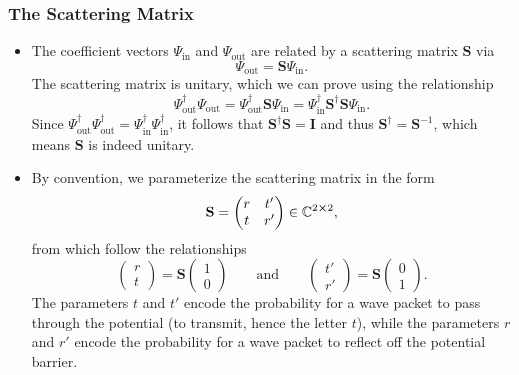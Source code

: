 \documentclass[11pt, a4paper]{article}
\newcommand{\mat}[1]{\mathbf{#1}}  %
\renewcommand{\SS}{\mat{S}}  %
\begin{document}
\subsubsection{The Scattering Matrix}
\begin{itemize}
    \item The coefficient vectors $ \Psi_{\text{in}} $ and $ \Psi_{\text{out}} $ are related by a scattering matrix $ \SS $ via
    \begin{equation*}
        \Psi_{\text{out}} = \SS \Psi_{\text{in}}.
    \end{equation*}
    The scattering matrix is unitary, which we can prove using the relationship
    \begin{equation*}
        \Psi_{\text{out}}^{\dagger} \Psi_{\text{out}} = \Psi_{\text{out}}^{\dagger} \SS \Psi_{\text{in}} = \Psi_{\text{in}}^{\dagger} \SS^{\dagger} \SS \Psi_{\text{in}}.
    \end{equation*}
    Since $ \Psi_{\text{out}}^{\dagger} \Psi_{\text{out}}^{\dagger} = \Psi_{\text{in}}^{\dagger} \Psi_{\text{in}}^{\dagger} $, it follows that $ \SS^{\dagger} \SS = \mathbf{I} $ and thus $ \SS^{\dagger} = \SS^{-1} $, which means $ \SS $ is indeed unitary.

    \item By convention, we parameterize the scattering matrix in the form
    \begin{equation*}
        \SS = 
        \begin{pmatrix}
            r & t'\\
            t & r'
        \end{pmatrix} \in \mathbb{C}^{2 \cross 2},
    \end{equation*}
    from which follow the relationships
    \begin{equation*}
        \begin{pmatrix}
            r\\
            t
        \end{pmatrix} 
        = \SS
        \begin{pmatrix}
            1\\
            0
        \end{pmatrix}
        \qquad \text{and} \qquad 
        \begin{pmatrix}
            t'\\
            r'
        \end{pmatrix}
        = \SS
        \begin{pmatrix}
            0\\
            1
        \end{pmatrix}.
    \end{equation*}
    The parameters $ t $ and $ t' $ encode the probability for a wave packet to pass through the potential (to transmit, hence the letter $ t $), while the parameters $ r $ and $ r' $ encode the probability for a wave packet to reflect off the potential barrier.
    

\end{itemize}
\end{document}
